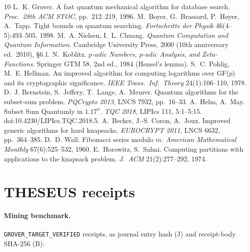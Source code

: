 \documentclass[11pt]{article}
\theoremstyle{definition}
\newcommand{\code}[1]{\texttt{\small #1}}
\begin{document}
\begin{thebibliography}{10}
 L.~K. Grover. A fast quantum mechanical algorithm for database search. \emph{Proc.\ 28th ACM STOC}, pp.~212--219, 1996.
 M.~Boyer, G.~Brassard, P.~H{\o}yer, A.~Tapp. Tight bounds on quantum searching. \emph{Fortschritte der Physik} 46(4--5):493--505, 1998.
 M.~A. Nielsen, I.~L. Chuang. \emph{Quantum Computation and Quantum Information}. Cambridge University Press, 2000 (10th anniversary ed.\ 2010), \S6.1.
 N.~Koblitz. \emph{$p$-adic Numbers, $p$-adic Analysis, and Zeta-Functions}. Springer GTM 58, 2nd ed., 1984 (Hensel's lemma).
 S.~C. Pohlig, M.~E. Hellman. An improved algorithm for computing logarithms over GF($p$) and its cryptographic significance. \emph{IEEE Trans.\ Inf.\ Theory} 24(1):106--110, 1978.
 D.~J. Bernstein, S.~Jeffery, T.~Lange, A.~Meurer. Quantum algorithms for the subset-sum problem. \emph{PQCrypto 2013}, LNCS 7932, pp.~16--33.
 A.~Helm, A.~May. Subset Sum Quantumly in $1.17^n$. \emph{TQC 2018}, LIPIcs 111, 5:1--5:15. doi:10.4230/LIPIcs.TQC.2018.5.
 A.~Becker, J.-S. Coron, A.~Joux. Improved generic algorithms for hard knapsacks. \emph{EUROCRYPT 2011}, LNCS 6632, pp.~364--385.
 D.~D. Wall. Fibonacci series modulo $m$. \emph{American Mathematical Monthly} 67(6):525--532, 1960.
 E.~Horowitz, S.~Sahni. Computing partitions with applications to the knapsack problem. \emph{J.\ ACM} 21(2):277--292, 1974.
\end{thebibliography}

\appendix
\section{THESEUS receipts}
\paragraph{Mining benchmark.} \code{GROVER\_TARGET\_VERIFIED} receipts, as journal entry hash (J) and receipt-body
SHA-256 (B):
\end{document}
